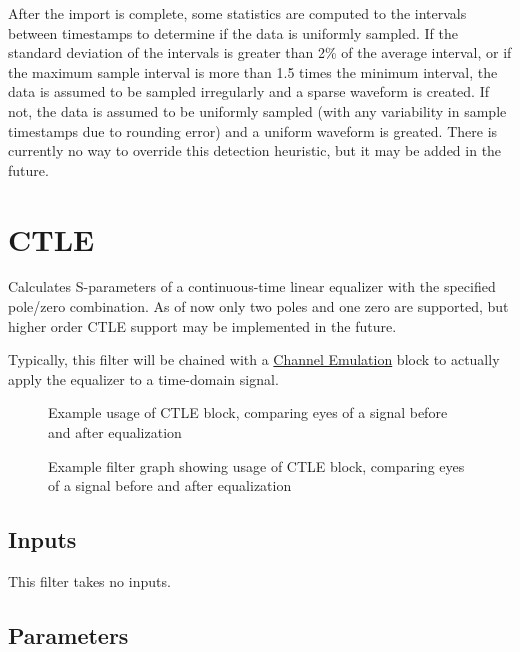 After the import is complete, some statistics are computed to the intervals between timestamps to determine if the data
is uniformly sampled. If the standard deviation of the intervals is greater than 2\% of the average interval, or if the
maximum sample interval is more than 1.5 times the minimum interval, the data is assumed to be sampled irregularly and
a sparse waveform is created. If not, the data is assumed to be uniformly sampled (with any variability in sample
timestamps due to rounding error) and a uniform waveform is greated. There is currently no way to override this
detection heuristic, but it may be added in the future.

\pagebreak
\section{CTLE}

Calculates S-parameters of a continuous-time linear equalizer with the specified pole/zero combination. As of now only
two poles and one zero are supported, but higher order CTLE support may be implemented in the future.

Typically, this filter will be chained with a \hyperref[filter:channelemu]{Channel Emulation} block to actually apply
the equalizer to a time-domain signal.

\begin{figure}[h]
\centering
{}
\caption{Example usage of CTLE block, comparing eyes of a signal before and after equalization}
\label{filter_ctle}
\end{figure}

\begin{figure}[h]
\centering
{}
\caption{Example filter graph showing usage of CTLE block, comparing eyes of a signal before and after equalization}
\label{filter_graph_ctle}
\end{figure}

\subsection{Inputs}

This filter takes no inputs.

\subsection{Parameters}

